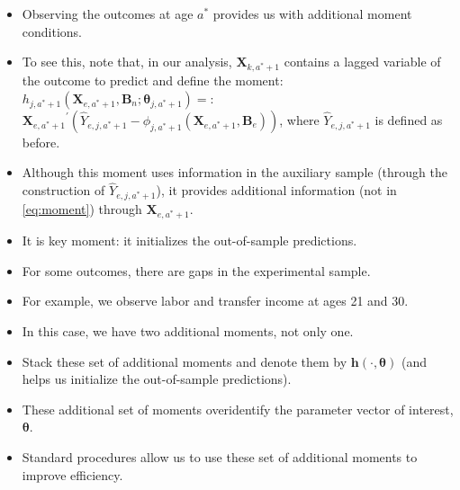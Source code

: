 \documentclass[static]{JJH-Beamer}
\begin{document}
\begin{frame}

\begin{itemize}
\item Observing the outcomes at age $a^*$ provides us with additional moment conditions.
\item To see this, note that, in our analysis,  $\bm{X}_{k,a^*+1}$ contains a lagged variable of the outcome to predict and define the moment: \\ $h_{j,a^*+1}  \left( \bm{X}_{e,a^*+1}, \bm{B}_{n} ; \bm{\theta}_{j,a^*+1} \right) =:$ \\  ${\bm{X}_{e,a^*+1}}^{'} \left( \hat{Y}_{e,j,a^*+1} - \phi_{j,a^*+1} \left ( \bm{X}_{e,a^*+1}, \bm{B}_{e} \right) \right)$, where $\hat{Y}_{e,j,a^*+1}$ is defined as before.
\item Although this moment uses information in the auxiliary sample (through the construction of $\hat{Y}_{e,j,a^*+1}$), it provides additional information (not in \eqref{eq:moment}) through $\bm{X}_{e,a^*+1}$.
\item It is key moment: it initializes the out-of-sample predictions.
\end{itemize}

\end{frame}

\begin{frame}

\begin{itemize}
\item For some outcomes, there are gaps in the experimental sample.
\item For example, we observe labor and transfer income at ages 21 and 30.
\item In this case, we have two additional moments, not only one.
\item Stack these set of additional moments and denote them by $\bm{h} \left ( \cdot, \bm{\theta} \right)$ (and helps us initialize the out-of-sample predictions).
\item These additional set of moments overidentify the parameter vector of interest, $\bm{\theta}$.
\item Standard procedures allow us to use these set of additional moments to improve efficiency.
\end{itemize}

\end{frame}
\end{document}
